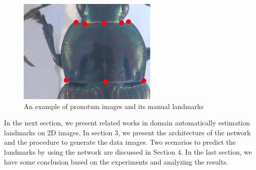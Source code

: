 \documentclass[10pt]{article}
\begin{document}

\begin{figure}[htbp]
\centering
	\centerline{\includegraphics[scale=0.8]{images/pronotum}}
	\caption{An example of pronotum images and its manual landmarks}
	\label{figpronotum}
\end{figure}

In the next section, we present related works in domain automatically estimation landmarks on 2D images. In section 3, we present the architecture of the network and the procedure to generate the data images. Two scenarios to predict the landmarks by using the network are discussed in Section 4. In the last section, we have some conclusion based on the experiments and analyzing the results.
\end{document}

